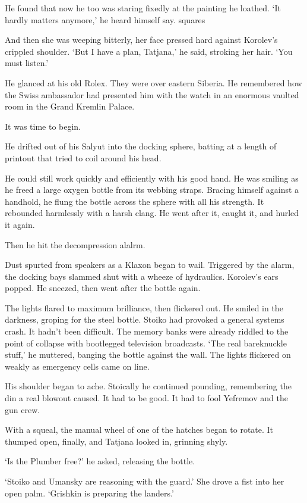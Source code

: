 He found that now he too was staring fixedly at the painting he loathed. `It hardly matters anymore,' he heard himself say.
squares

And then she was weeping bitterly, her face pressed hard against Korolev's crippled shoulder. `But I have a plan, Tatjana,' he said, stroking her hair. `You must listen.'

He glanced at his old Rolex. They were over eastern Siberia. He remembered how the Swiss ambassador had presented him with the watch in an enormous vaulted room in the Grand Kremlin Palace.

It was time to begin.

He drifted out of his Salyut into the docking sphere, batting at a length of printout that tried to coil around his head.

He could still work quickly and efficiently with his good hand. He was smiling as he freed a large oxygen bottle from its webbing straps. Bracing himself against a handhold, he flung the bottle across the sphere with all his strength. It rebounded harmlessly with a harsh clang. He went after it, caught it, and hurled it again.

Then he hit the decompression alalrm.

Dust spurted from speakers as a Klaxon began to wail. Triggered by the alarm, the docking bays slammed shut with a wheeze of hydraulics. Korolev's ears popped. He sneezed, then went after the bottle again.

The lights flared to maximum brilliance, then flickered out. He smiled in the darkness, groping for the steel bottle. Stoiko had provoked a general systems crash. It hadn't been difficult. The memory banks were already riddled to the point of collapse with bootlegged television broadcasts. `The real bareknuckle stuff,' he muttered, banging the bottle against the wall. The lights flickered on weakly as emergency cells came on line.

His shoulder began to ache. Stoically he continued pounding, remembering the din a real blowout caused. It had to be good. It had to fool Yefremov and the gun crew.

With a squeal, the manual wheel of one of the hatches began to rotate. It thumped open, finally, and Tatjana looked in, grinning shyly.

`Is the Plumber free?' he asked, releasing the bottle.

`Stoiko and Umansky are reasoning with the guard.' She drove a fist into her open palm. `Grishkin is preparing the landers.'

